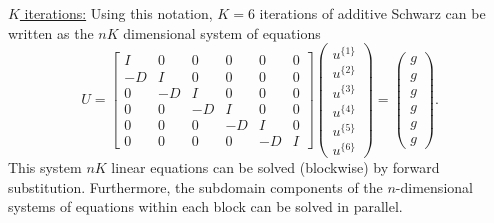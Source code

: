 \bigskip
\noindent\underline{$K$ iterations:} \quad
Using this notation, $K=6$ iterations of additive Schwarz can be written as the $nK$ dimensional system of equations
\begin{equation}
\label{eq:additive_Schwarz_forward}
U=
\left[
\begin{matrix}
  I &  0 &  0 &  0 &  0 & 0   \\
 -D &  I &  0 &  0 &  0 & 0   \\
  0 & -D &  I &  0 &  0 & 0   \\
  0 &  0 & -D &  I &  0 & 0   \\
  0 &  0 &  0 & -D &  I & 0   \\
  0 &  0 &  0 &  0 & -D & I
\end{matrix}
\right]
\left(
\begin{matrix}
u^{\{1\}}  \\
u^{\{2\}}  \\
u^{\{3\}}  \\
u^{\{4\}}  \\
u^{\{5\}}  \\
u^{\{6\}}
\end{matrix}
\right)
=
\left(
\begin{matrix}
g  \\
g  \\
g  \\
g  \\
g  \\
g
\end{matrix}
\right).
\end{equation}
This system $nK$ linear equations can be solved (blockwise) by forward substitution. Furthermore, the subdomain components of the $n$-dimensional systems of equations within each block can be solved in parallel.

